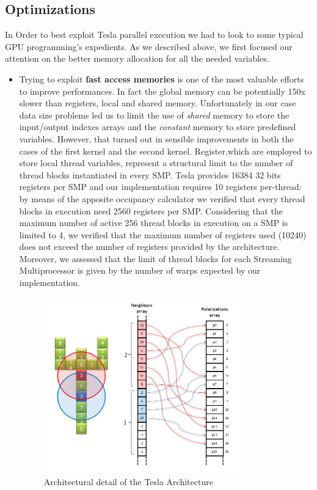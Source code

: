 \subsection{Optimizations}
\label{sec:optimizations}
In Order to best exploit Tesla parallel execution we had to look to some typical GPU programming's expedients.
As we described above, we first focused our attention on the better memory allocation for all the needed variables.
\begin{itemize}
 \item Trying to exploit \textbf{fast access memories} is one of the most valuable efforts to improve performances.
In fact the global memory can be potentially 150x slower than registers, local and shared memory.\newline
Unfortunately in our case data size problems led us to limit the use of \textit{shared} memory to store the input/output indexes arrays and  the
\textit{constant} memory to store predefined variables. However, that turned out in sensible improvements in both the cases of the first kernel and
the second kernel.\newline 
Register,which are employed to store local thread variables, represent a structural limit to the number of thread blocks 
instantiated in every SMP. Tesla provides 16384 32 bits registers per SMP and our implementation requires 10 registers per-thread: by means of the 
apposite occupancy calculator we verified that every thread blocks in execution need 2560 registers per SMP.
Considering that the maximum number of active 256 thread blocks in execution on a SMP is limited to 4, we verified that the maximum 
number of registers used (10240) does not exceed the number of registers provided by the architecture. Moreover, we assessed that the limit
of thread blocks for each Streaming Multiprocessor is given by the number of warps expected by our implementation.

\begin{figure}[h!tp]
    \centering
     \includegraphics[width=0.8\textwidth]{./img/Divergence}
\caption{Architectural detail of the Tesla Architecture}\label{fig:divergence}
    \end{figure}



\end{itemize}
